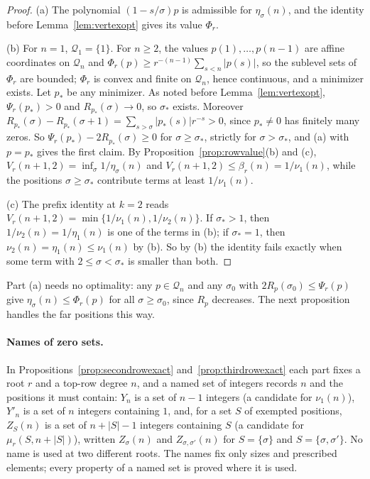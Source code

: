 \documentclass[11pt]{article}
\begin{document}
\begin{proof}
(a) The polynomial $(1-s/\sigma)p$ is admissible for $\eta_\sigma(n)$, and
the identity before Lemma~\ref{lem:vertexopt} gives its value $\Phi_r$.

(b) For $n=1$, $\mathcal Q_1=\{1\}$.  For $n\ge2$, the values
$p(1),\ldots,p(n-1)$ are affine coordinates on $\mathcal Q_n$ and
$\Phi_r(p)\ge r^{-(n-1)}\sum_{s<n}|p(s)|$, so the sublevel sets of $\Phi_r$ are
bounded; $\Phi_r$ is convex and finite on $\mathcal Q_n$, hence continuous,
and a minimizer exists.  Let $p_*$ be any minimizer.  As noted before
Lemma~\ref{lem:vertexopt}, $\Psi_r(p_*)>0$ and $R_{p_*}(\sigma)\to0$, so $\sigma_*$ exists.  Moreover
$R_{p_*}(\sigma)-R_{p_*}(\sigma+1)=\sum_{s>\sigma}|p_*(s)|r^{-s}>0$, since
$p_*\ne0$ has finitely many zeros.  So $\Psi_r(p_*)-2R_{p_*}(\sigma)\ge0$ for
$\sigma\ge\sigma_*$, strictly for $\sigma>\sigma_*$, and (a) with $p=p_*$
gives the first claim.  By Proposition~\ref{prop:rowvalue}(b) and (c),
$V_r(n+1,2)=\inf_\sigma1/\eta_\sigma(n)$ and
$V_r(n+1,2)\le\beta_r(n)=1/\nu_1(n)$, while the positions
$\sigma\ge\sigma_*$ contribute terms at least $1/\nu_1(n)$.

(c) The prefix identity at $k=2$ reads
$V_r(n+1,2)=\min\{1/\nu_1(n),1/\nu_2(n)\}$.  If $\sigma_*>1$, then
$1/\nu_2(n)=1/\eta_1(n)$ is one of the terms in (b); if $\sigma_*=1$, then
$\nu_2(n)=\eta_1(n)\le\nu_1(n)$ by (b).  So by (b) the identity fails
exactly when some term with $2\le\sigma<\sigma_*$ is smaller than both.
\end{proof}

Part (a) needs no optimality: any $p\in\mathcal Q_n$ and any $\sigma_0$
with $2R_p(\sigma_0)\le\Psi_r(p)$ give $\eta_\sigma(n)\le\Phi_r(p)$ for all
$\sigma\ge\sigma_0$, since $R_p$ decreases.  The next proposition handles
the far positions this way.

\paragraph{Names of zero sets.}
In Propositions~\ref{prop:secondrowexact} and~\ref{prop:thirdrowexact} each
part fixes a root $r$ and a top-row degree $n$, and a named set of integers
records $n$ and the positions it must contain: $Y_n$ is a set of $n-1$
integers (a candidate for $\nu_1(n)$), $Y'_n$ is a set of $n$ integers
containing $1$, and, for a set $S$ of exempted positions, $Z_S(n)$ is a set
of $n+|S|-1$ integers containing $S$ (a candidate for $\mu_r(S,n+|S|)$),
written $Z_\sigma(n)$ and $Z_{\sigma,\sigma'}(n)$ for $S=\{\sigma\}$ and
$S=\{\sigma,\sigma'\}$.  No name is used at two different roots.  The names
fix only sizes and prescribed elements; every property of a named set is
proved where it is used.
\end{document}
